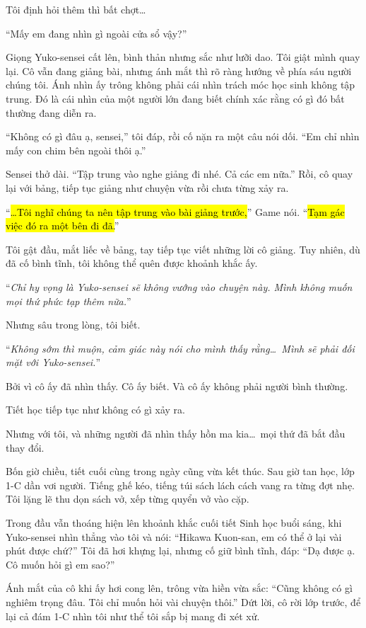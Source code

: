 \documentclass[../main.tex]{subfiles}
\begin{document}
Tôi định hỏi thêm thì bất chợt\dots

``Mấy em đang nhìn gì ngoài cửa sổ vậy?''

Giọng Yuko-sensei cất lên, bình thản nhưng sắc như lưỡi dao. Tôi giật mình quay lại. Cô vẫn đang giảng bài, nhưng ánh mắt thì rõ ràng hướng về phía sáu người chúng tôi. Ánh nhìn ấy trông không phải cái nhìn trách móc học sinh không tập trung. Đó là cái nhìn của một người lớn đang biết chính xác rằng có gì đó bất thường đang diễn ra.

``Không có gì đâu ạ, sensei,'' tôi đáp, rồi cố nặn ra một câu nói dối. ``Em chỉ nhìn mấy con chim bên ngoài thôi ạ.''

Sensei thở dài. ``Tập trung vào nghe giảng đi nhé. Cả các em nữa.'' Rồi, cô quay lại với bảng, tiếp tục giảng như chuyện vừa rồi chưa từng xảy ra.

``\hl{\dots Tôi nghĩ chúng ta nên tập trung vào bài giảng trước,}'' Game nói. ``\hl{Tạm gác việc đó ra một bên đi đã.}''

Tôi gật đầu, mắt liếc về bảng, tay tiếp tục viết những lời cô giảng. Tuy nhiên, dù đã cố bình tĩnh, tôi không thể quên được khoảnh khắc ấy.

``\textit{Chỉ hy vọng là Yuko-sensei sẽ không vướng vào chuyện này. Mình không muốn mọi thứ phức tạp thêm nữa.}''

Nhưng sâu trong lòng, tôi biết.

``\textit{Không sớm thì muộn, cảm giác này nói cho mình thấy rằng\dots\ Mình sẽ phải đối mặt với Yuko-sensei.}''

Bởi vì cô ấy đã nhìn thấy. Cô ấy biết. Và cô ấy không phải người bình thường.

Tiết học tiếp tục như không có gì xảy ra.

Nhưng với tôi, và những người đã nhìn thấy hồn ma kia\dots\ mọi thứ đã bắt đầu thay đổi.

\ct

Bốn giờ chiều, tiết cuối cùng trong ngày cũng vừa kết thúc. Sau giờ tan học, lớp 1-C dần vơi người. Tiếng ghế kéo, tiếng túi sách lách cách vang ra từng đợt nhẹ. Tôi lặng lẽ thu dọn sách vở, xếp từng quyển vở vào cặp.

Trong đầu vẫn thoáng hiện lên khoảnh khắc cuối tiết Sinh học buổi sáng, khi Yuko-sensei nhìn thẳng vào tôi và nói: ``Hikawa Kuon-san, em có thể ở lại vài phút được chứ?'' Tôi đã hơi khựng lại, nhưng cố giữ bình tĩnh, đáp: ``Dạ được ạ. Cô muốn hỏi gì em sao?''

Ánh mắt của cô khi ấy hơi cong lên, trông vừa hiền vừa sắc: ``Cũng không có gì nghiêm trọng đâu. Tôi chỉ muốn hỏi vài chuyện thôi.'' Dứt lời, cô rời lớp trước, để lại cả đám 1-C nhìn tôi như thể tôi sắp bị mang đi xét xử.
\end{document}
